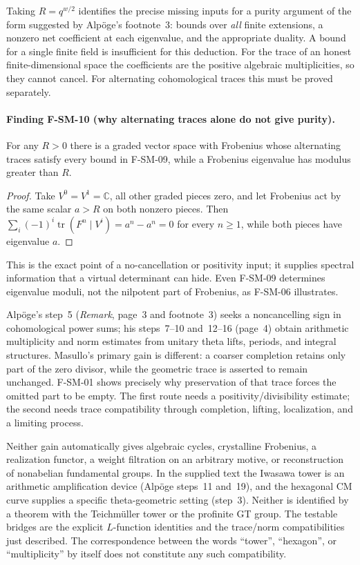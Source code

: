 Taking $R=q^{w/2}$ identifies the precise missing inputs for a purity
argument of the form suggested by Alp\"oge's footnote~3: bounds over
\emph{all} finite extensions, a nonzero net coefficient at each eigenvalue,
and the appropriate duality.  A bound for a single finite field is
insufficient for this deduction.  For the trace of an honest finite-dimensional
space the coefficients are the positive algebraic multiplicities, so
they cannot cancel.  For alternating cohomological traces this must
be proved separately.

\paragraph{Finding F-SM-10 (why alternating traces alone do not give purity).}
For any $R>0$ there is a graded vector space with Frobenius whose
alternating traces satisfy every bound in F-SM-09, while a Frobenius
eigenvalue has modulus greater than $R$.

\begin{proof}
Take $V^0=V^1=\mathbb C$, all other graded pieces zero, and let
Frobenius act by the same scalar $a>R$ on both nonzero pieces.
Then $\sum_i(-1)^i\operatorname{tr}(F^n\mid V^i)=a^n-a^n=0$
for every $n\geq1$, while both pieces have eigenvalue $a$.
\end{proof}

This is the exact point of a no-cancellation or positivity input;
it supplies spectral information that a virtual determinant can hide.
Even F-SM-09 determines eigenvalue moduli, not the nilpotent part of
Frobenius, as F-SM-06 illustrates.

Alp\"oge's step~5 (\emph{Remark}, page~3 and footnote~3) seeks a
noncancelling sign in cohomological power sums; his steps~7--10 and~12--16
(page~4) obtain arithmetic multiplicity and norm estimates from unitary
theta lifts, periods, and integral structures.  Masullo's primary gain is
different: a coarser completion retains only part of the zero divisor,
while the geometric trace is asserted to remain unchanged.  F-SM-01
shows precisely why preservation of that trace forces the omitted part
to be empty.  The first route needs a positivity/divisibility estimate;
the second needs trace compatibility through completion, lifting,
localization, and a limiting process.

Neither gain automatically gives algebraic cycles, crystalline
Frobenius, a realization functor, a weight filtration on an arbitrary
motive, or reconstruction of nonabelian fundamental groups.  In the
supplied text the Iwasawa tower is an arithmetic amplification device
(Alp\"oge steps~11 and~19), and the hexagonal CM curve supplies a
specific theta-geometric setting (step~3).  Neither is identified by a
theorem with the Teichm\"uller tower or the profinite GT group.
The testable bridges are the explicit $L$-function identities and the
trace/norm compatibilities just described.  The correspondence between
the words ``tower'', ``hexagon'', or ``multiplicity'' by itself does not
constitute any such compatibility.

